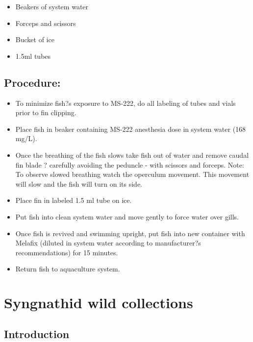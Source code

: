 \documentclass[
  letterpaper,
  DIV=11,
  numbers=noendperiod]{scrreprt}
\providecommand{\tightlist}{%
  \setlength{\itemsep}{0pt}\setlength{\parskip}{0pt}}\usepackage{longtable,booktabs,array}
\begin{document}
\begin{itemize}
\tightlist
\item
  Beakers of system water
\item
  Forceps and scissors
\item
  Bucket of ice
\item
  1.5ml tubes
\end{itemize}

\hypertarget{procedure-60}{%
\section{Procedure:}\label{procedure-60}}

\begin{itemize}
\tightlist
\item
  To minimize fish?s exposure to MS-222, do all labeling of tubes and
  vials prior to fin clipping.
\item
  Place fish in beaker containing MS-222 anesthesia dose in system water
  (168 mg/L).
\item
  Once the breathing of the fish slows take fish out of water and remove
  caudal fin blade ? carefully avoiding the peduncle - with scissors and
  forceps. Note: To observe slowed breathing watch the operculum
  movement. This movement will slow and the fish will turn on its side.
\item
  Place fin in labeled 1.5 ml tube on ice.
\item
  Put fish into clean system water and move gently to force water over
  gills.
\item
  Once fish is revived and swimming upright, put fish into new container
  with Melafix (diluted in system water according to manufacturer?s
  recommendations) for 15 minutes.
\item
  Return fish to aquaculture system.
\end{itemize}

\hypertarget{sec-vert_exp-sygnathid_collections}{%
\chapter{Syngnathid wild
collections}\label{sec-vert_exp-sygnathid_collections}}

\hypertarget{introduction-66}{%
\section{Introduction}\label{introduction-66}}
\end{document}
